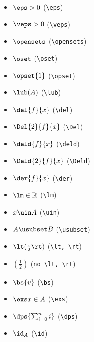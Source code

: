 \graphicspath{{chapters/chapter0/img}}

\begin{itemize}
    \item $\eps > 0$ \hfill (\texttt{\textbackslash eps})
    \item $\veps > 0$ \hfill (\texttt{\textbackslash veps})
    \item $\opensets$ \hfill (\texttt{\textbackslash opensets})
    \item $\oset$ \hfill (\texttt{\textbackslash oset})
    \item $\opset{1}$ \hfill (\texttt{\textbackslash opset})
    \item $\lub(A)$ \hfill (\texttt{\textbackslash lub})
    \item $\del{f}{x}$ \hfill (\texttt{\textbackslash del})
    \item $\Del{2}{f}{x}$ \hfill (\texttt{\textbackslash Del})
    \item $\deld{f}{x}$ \hfill (\texttt{\textbackslash deld})
    \item $\Deld{2}{f}{x}$ \hfill (\texttt{\textbackslash Deld})
    \item $\der{f}{x}$ \hfill (\texttt{\textbackslash der})
    \item $\lm \in \mathbb{R}$ \hfill (\texttt{\textbackslash lm})
    \item $x \uin A$ \hfill (\texttt{\textbackslash uin})
    \item $A \usubset B$ \hfill (\texttt{\textbackslash usubset})
    \item $\lt( \frac{1}{2} \rt)$ \hfill (\texttt{\textbackslash lt, \textbackslash rt})
    \item $( \frac{1}{2} )$ \hfill (\texttt{no \textbackslash lt, \textbackslash rt})

    \item $\bs{v}$ \hfill (\texttt{\textbackslash bs})
    \item $\exs x \in A$ \hfill (\texttt{\textbackslash exs})
    \item $\dps{\sum_{i=0}^n i}$ \hfill (\texttt{\textbackslash dps})
    \item $\id_A$ \hfill (\texttt{\textbackslash id})
\end{itemize}

\chapter{}
